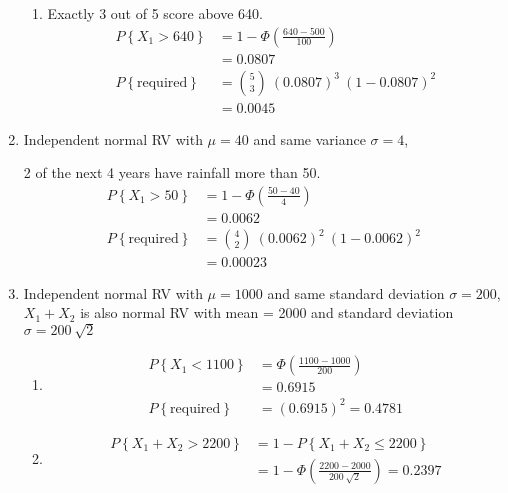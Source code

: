\begin{enumerate}
\begin{enumerate}
			
			\item Exactly 3 out of 5 score above 640.
			\begin{align}
				P \left\{X_1 > 640\right\} &= 1 - \Phi\left(\frac{640 - 500}{100}\right) \nonumber \\
				&= 0.0807 \nonumber \\
				P\left\{\text{required}\right\} &= \binom{5}{3}\ (0.0807)^3\ (1- 0.0807)^2 \nonumber \\
				&= 0.0045
			\end{align}
			
		\end{enumerate}
	
	
	\item Independent normal RV with $ \mu = 40 $ and same variance $ \sigma = 4 $,
	
		2 of the next 4 years have rainfall more than 50.
		\begin{align}
			P \left\{X_1 > 50\right\} &= 1 - \Phi\left(\frac{50 - 40}{4}\right) \nonumber \\
			&= 0.0062 \nonumber \\
			P\left\{\text{required}\right\} &= \binom{4}{2}\ (0.0062)^2\ (1- 0.0062)^2 \nonumber \\
			&= 0.00023
		\end{align}
	
	
	\item Independent normal RV with $ \mu = 1000 $ and same standard deviation $ \sigma = 200 $,
	$ X_1 + X_2 $ is also normal RV with mean = 2000 and standard deviation $ \sigma = 200\ \sqrt{2} $
	
		\begin{enumerate}
			\item \begin{align}
				P \left\{X_1 < 1100\right\} &= \Phi\left(\frac{1100 - 1000}{200}\right) \nonumber \\
				&= 0.6915 \\
				P\left\{\text{required}\right\} &= (0.6915)^2 = 0.4781
			\end{align}
			
			
			\item \begin{align}
				P \left\{X_1 + X_2 > 2200\right\} &= 1 - P \left\{X_1 + X_2 \leq 2200\right\} \nonumber \\
				& = 1 - \Phi\left(\frac{2200 - 2000}{200\ \sqrt{2}}\right) = 0.2397
			\end{align}
		\end{enumerate}
	

\end{enumerate}

